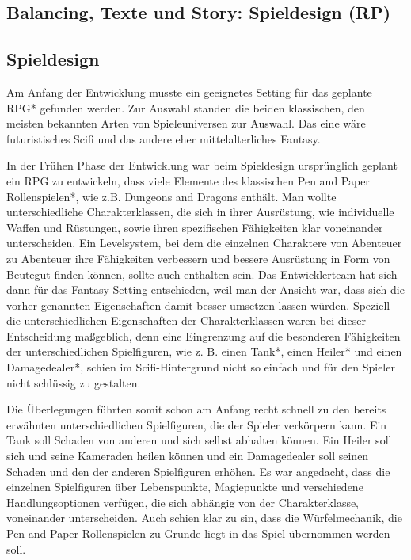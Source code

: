 

\subsection{Balancing, Texte und Story: Spieldesign (RP)}



\subsection{Spieldesign} Am Anfang der Entwicklung musste ein geeignetes Setting für das geplante RPG* gefunden werden. Zur Auswahl standen die beiden klassischen, den meisten bekannten Arten von Spieleuniversen zur Auswahl. Das eine wäre futuristisches Scifi und das andere eher mittelalterliches Fantasy. 

In der Frühen Phase der Entwicklung war beim Spieldesign ursprünglich geplant ein RPG zu entwickeln, dass viele Elemente des klassischen Pen and Paper Rollenspielen*, wie z.B. Dungeons and Dragons enthält. Man wollte unterschiedliche Charakterklassen, die sich in ihrer Ausrüstung, wie individuelle Waffen und Rüstungen, sowie ihren spezifischen Fähigkeiten klar voneinander unterscheiden. Ein Levelsystem, bei dem die einzelnen Charaktere von Abenteuer zu Abenteuer ihre Fähigkeiten verbessern und bessere Ausrüstung in Form von Beutegut finden können, sollte auch enthalten sein. Das Entwicklerteam hat sich dann für das Fantasy Setting entschieden, weil man der Ansicht war, dass sich die vorher genannten Eigenschaften damit besser umsetzen lassen würden. Speziell die unterschiedlichen Eigenschaften der Charakterklassen waren bei dieser Entscheidung maßgeblich, denn eine Eingrenzung auf die besonderen Fähigkeiten der unterschiedlichen Spielfiguren, wie z. B. einen Tank*, einen Heiler* und einen Damagedealer*, schien im Scifi-Hintergrund nicht so einfach und für den Spieler nicht schlüssig zu gestalten.

Die Überlegungen führten somit schon am Anfang recht schnell zu den bereits erwähnten unterschiedlichen Spielfiguren, die der Spieler verkörpern kann. Ein Tank soll Schaden von anderen und sich selbst abhalten können. Ein Heiler soll sich und seine Kameraden heilen können und ein Damagedealer soll seinen Schaden und den der anderen Spielfiguren erhöhen. Es war angedacht, dass die einzelnen Spielfiguren über Lebenspunkte, Magiepunkte und verschiedene Handlungsoptionen verfügen, die sich abhängig von der Charakterklasse, voneinander unterscheiden. Auch schien klar zu sin, dass die Würfelmechanik, die Pen and Paper Rollenspielen zu Grunde liegt in das Spiel übernommen werden soll.

